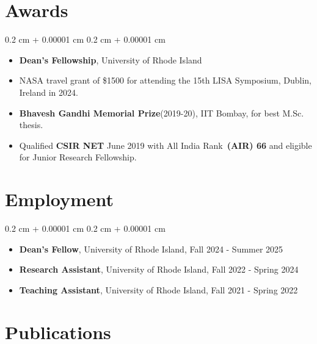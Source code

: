 \documentclass[10pt, letterpaper]{article}
\newenvironment{highlightsforbulletentries}{
    \begin{itemize}[
        topsep=0.10 cm,
        parsep=0.10 cm,
        partopsep=0pt,
        itemsep=0pt,
        leftmargin=10pt
    ]
}{
    \end{itemize}
}
\newenvironment{onecolentry}{
    \begin{adjustwidth}{
        0.2 cm + 0.00001 cm
    }{
        0.2 cm + 0.00001 cm
    }
}{
    \end{adjustwidth}
}
\begin{document}
\section{Awards} 
\begin{onecolentry}
  \begin{highlightsforbulletentries}
    \item \textbf{Dean's Fellowship}, University of Rhode Island

    \item NASA travel grant of \$1500 for attending the 15th LISA Symposium, Dublin, Ireland in 2024.

    \item \textbf{Bhavesh Gandhi Memorial Prize}(2019-20), IIT Bombay, for best M.Sc. thesis.

    \item Qualified \textbf{CSIR NET} June 2019 with All India Rank~\textbf{(AIR) 66} and eligible for Junior Research Fellowship.
  \end{highlightsforbulletentries}
\end{onecolentry}


\section{Employment} 
\begin{onecolentry}
  \begin{highlightsforbulletentries}
    \item \textbf{Dean's Fellow}, University of Rhode Island, Fall 2024 - Summer 2025
    \item \textbf{Research Assistant}, University of Rhode Island, Fall 2022 - Spring 2024
    \item \textbf{Teaching Assistant}, University of Rhode Island, Fall 2021 - Spring 2022
  \end{highlightsforbulletentries}
\end{onecolentry}


\section{Publications}
\end{document}
